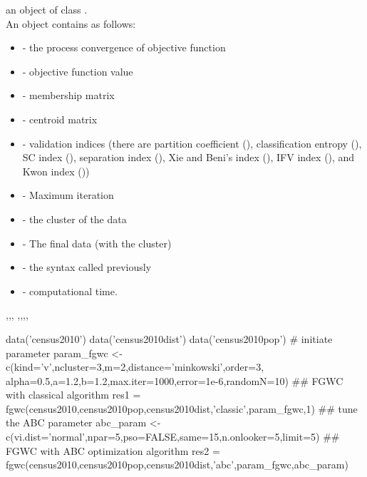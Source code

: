 \documentclass[a4paper]{book}
\begin{document}
%
\begin{Value}
an object of class .\\{}
An  object contains as follows:
\begin{itemize}

\item{}  - the process convergence of objective function
\item{}  - objective function value
\item{}  - membership matrix
\item{}  - centroid matrix
\item{}  - validation indices (there are partition coefficient (), classification entropy (), 
SC index (), separation index (), Xie and Beni's index (), IFV index (), and Kwon index ())
\item{}  - Maximum iteration
\item{}  - the cluster of the data
\item{}  - The final data (with the cluster)
\item{}  - the syntax called previously
\item{}  - computational time.

\end{itemize}

\end{Value}
%
\begin{SeeAlso}\relax
{},,,
,,,,
\end{SeeAlso}
%
\begin{Examples}
\begin{ExampleCode}
data('census2010')
data('census2010dist')
data('census2010pop')
# initiate parameter
param_fgwc <- c(kind='v',ncluster=3,m=2,distance='minkowski',order=3,
               alpha=0.5,a=1.2,b=1.2,max.iter=1000,error=1e-6,randomN=10)
## FGWC with classical algorithm
res1 = fgwc(census2010,census2010pop,census2010dist,'classic',param_fgwc,1)
## tune the ABC parameter
abc_param <- c(vi.dist='normal',npar=5,pso=FALSE,same=15,n.onlooker=5,limit=5) 
## FGWC with ABC optimization algorithm
res2 = fgwc(census2010,census2010pop,census2010dist,'abc',param_fgwc,abc_param) 
\end{ExampleCode}
\end{Examples}
\printindex{}
\end{document}
